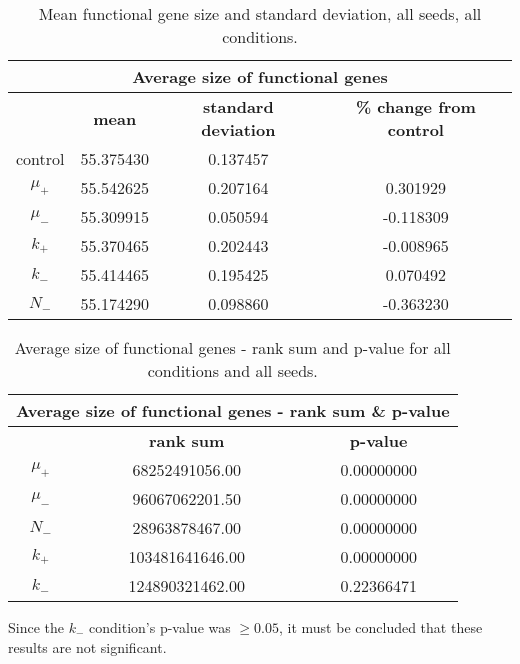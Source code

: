 \begin{table}[H]
	\centering
	\begin{tabular}{|c|c|c|c|}
		\hline
		\multicolumn{4}{c}{\Large \textbf{Average size of functional genes}} \\
		\hline
		& \textbf{mean} & \textbf{standard deviation} & \textbf{\% change from control} \\
		\hline
		control & 55.375430 & 0.137457 & \textemdash \\ 
		\hline
		$\mu_+$ & 55.542625 & 0.207164 & 0.301929 \\ 
		\hline
		$\mu_-$ & 55.309915 & 0.050594 & -0.118309 \\ 
		\hline
		$k_+$ & 55.370465 & 0.202443 & -0.008965 \\ 
		\hline
		$k_-$ & 55.414465 & 0.195425 & 0.070492 \\ 
		\hline
		$N_-$ & 55.174290 & 0.098860 & -0.363230 \\ 
		\hline
	\end{tabular}
	\caption[Mean functional gene size and standard deviation]{Mean functional gene size and standard deviation, all seeds, all conditions.}
	\label{table:mean_functional_gene_size_and_std_dev}
\end{table}

\begin{table}[H]
	\begin{tabular}{|c|c|c|}
		\hline
		\multicolumn{3}{c}{\Large \textbf{Average size of functional genes - rank sum \& p-value}} \\
		\hline
		& \textbf{rank sum} & \textbf{p-value} \\
		\hline
		$\mu_+$ & 68252491056.00 & 0.00000000 \\ 
		\hline
		$\mu_-$ & 96067062201.50 & 0.00000000 \\ 
		\hline
		$N_-$ & 28963878467.00 & 0.00000000 \\ 
		\hline
		$k_+$ & 103481641646.00 & 0.00000000 \\ 
		\hline
		$k_-$ & 124890321462.00 & 0.22366471 \\ 
		\hline
	\end{tabular}
	\caption[Average size of functional genes - rank sum and p-value]{Average size of functional genes - rank sum and p-value for all conditions and all seeds.}
	\label{table:avg_size_of_functional_genes_rank_sum_and_p-value}
\end{table}
Since the $k_-$ condition's p-value was $\geq0.05$, it must be concluded that these results are not significant. 

